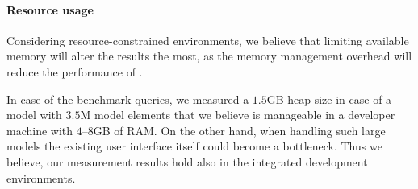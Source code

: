 \paragraph{Resource usage}
Considering resource-constrained environments, we believe that limiting
available memory will alter the results the most, as the memory management
overhead will reduce the performance of \eiq{}.

In case of the benchmark queries, we measured a $1.5$GB heap size in case of a
model with $3.5$M model elements that we believe is manageable in a developer
machine with $4$--$8$GB of RAM. On the other hand, when handling such large
models the existing user interface itself could become a bottleneck. Thus we
believe, our measurement results hold also in the integrated development
environments.
